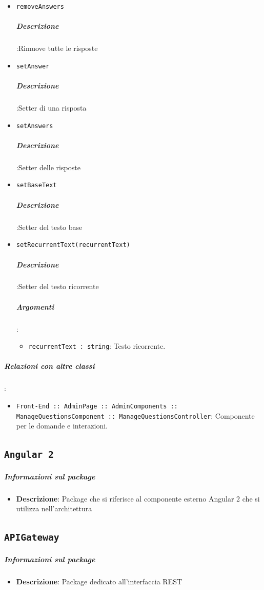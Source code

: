 \documentclass[../DefinizioneDiProdotto_v2.0.0.tex]{subfiles}
\begin{document}
\begin{itemize}
		      	\item \texttt{removeAnswers}
		      	      \subparagraph{Descrizione}:Rimuove tutte le risposte

		      	\item \texttt{setAnswer}
		      	      \subparagraph{Descrizione}:Setter di una risposta

		      	\item \texttt{setAnswers}
		      	      \subparagraph{Descrizione}:Setter delle risposte

		      	\item \texttt{setBaseText}
		      	      \subparagraph{Descrizione}:Setter del testo base

		      	\item \texttt{setRecurrentText(recurrentText)}
		      	      \subparagraph{Descrizione}:Setter del testo ricorrente
					\subparagraph{Argomenti}:
						\begin{itemize}
							\item \texttt{recurrentText : string}:
								Testo ricorrente.
						\end{itemize}
		      \end{itemize}\vspace{0.5em}
		\subparagraph{Relazioni con altre classi}:
		      \begin{itemize}
		      	\item \texttt{Front-End :: AdminPage :: AdminComponents :: ManageQuestionsComponent :: ManageQuestionsController}: Componente per le domande e interazioni.
		      \end{itemize}



\subsection{\texttt{Angular 2}}
\subparagraph{Informazioni sul package}
\begin{itemize}
	\item \textbf{Descrizione}: Package che si riferisce al componente esterno Angular 2 che si utilizza nell'architettura
\end{itemize}
\subsection{\texttt{APIGateway}}
\subparagraph{Informazioni sul package}
\begin{itemize}
	\item \textbf{Descrizione}: Package dedicato all'interfaccia REST
\end{itemize}
\newpage
\end{document}
